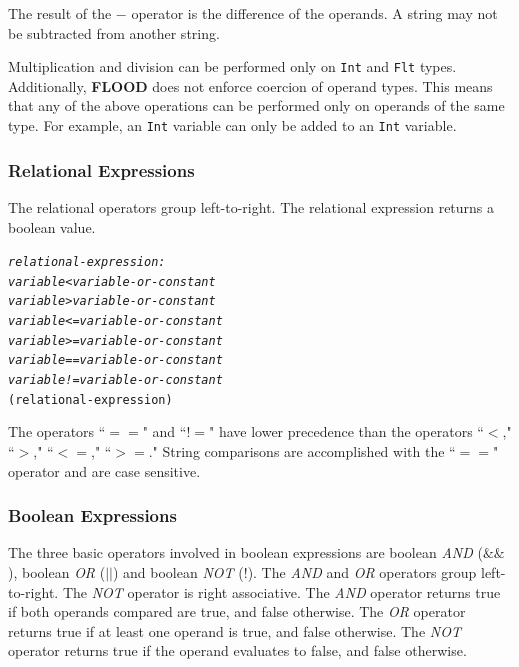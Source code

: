\documentclass[12pt]{report}
\begin{document}
The result of the $-$ operator is the difference of the operands. A string may not be subtracted from another string.

Multiplication and division can be performed only on \texttt{Int} and \texttt{Flt} types. Additionally, \textbf{FLOOD} does not enforce coercion of operand types. This means that any of the above operations can be performed only on operands of the same type. For example, an \texttt{Int} variable can only be added to an \texttt{Int} variable.

\subsubsection{Relational Expressions}

The relational operators group left-to-right. The relational expression returns a boolean value.

\begin{alltt}\begin{singlespace}
         \textit{relational-expression:}
            \textit{variable < variable-or-constant}
            \textit{variable > variable-or-constant}
            \textit{variable <= variable-or-constant}
            \textit{variable >= variable-or-constant}
            \textit{variable == variable-or-constant}
            \textit{variable != variable-or-constant}
            (relational-expression)\end{singlespace}
\end{alltt}

The operators ``$==$" and ``$!$$=$" have lower precedence than the operators ``$<$," ``$>$," ``$<=$," ``$>=$." String comparisons are accomplished with the ``$==$" operator and are case sensitive.

\subsubsection{Boolean Expressions}

The three basic operators involved in boolean expressions are boolean \textit{AND} ($\&\&$), boolean \textit{OR} ($||$) and boolean \textit{NOT} ($!$). The \textit{AND} and \textit{OR} operators group left-to-right. The \textit{NOT} operator is right associative. The \textit{AND} operator returns true if both operands compared are true, and false otherwise. The \textit{OR} operator returns true if at least one operand is true, and false otherwise. The \textit{NOT} operator returns true if the operand evaluates to false, and false otherwise.
\end{document}
